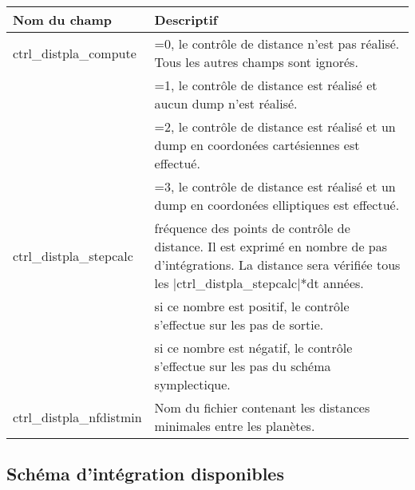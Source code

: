 \documentclass[11pt]{article}
\begin{document}
\begin{tabularx}{\textwidth}{|l|X|}
\hline
Nom du champ& Descriptif \\ \hline \hline
ctrl\_distpla\_compute & =0, le contr\^ole de distance n'est pas r\'ealis\'e. Tous les autres champs sont ignor\'es.\\
&=1, le contr\^ole de distance est r\'ealis\'e et aucun dump n'est r\'ealis\'e.\\  
&=2, le contr\^ole de distance est r\'ealis\'e et un dump en coordon\'ees cart\'esiennes est effectu\'e.\\
&=3, le contr\^ole de distance est r\'ealis\'e et un dump en coordon\'ees elliptiques est effectu\'e.\\  \hline
ctrl\_distpla\_stepcalc & fr\'equence des points de  contr\^ole de distance. Il est exprim\'e en nombre de pas d'int\'egrations. La distance sera v\'erifi\'ee tous les |ctrl\_distpla\_stepcalc|*dt ann\'ees. \\
& si ce nombre est positif, le contrôle s'effectue sur les pas de sortie. \\
& si ce nombre est n\'egatif, le contrôle s'effectue sur les pas du sch\'ema symplectique. \\ \hline
ctrl\_distpla\_nfdistmin & Nom du fichier contenant les distances minimales entre les plan\`etes. \\ \hline
 \end{tabularx}

\subsection{Sch\'ema d'intégration disponibles}\label{autresschemas}
\end{document}
